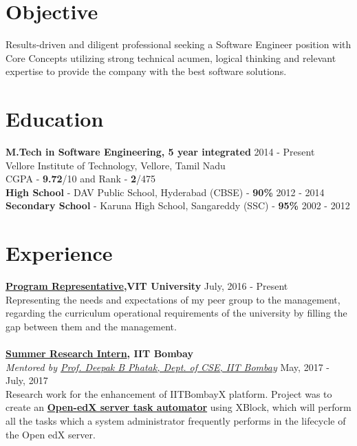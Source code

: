 \documentclass[margin, centered]{res}
\begin{document}
\begin{resume}

\section{Objective}
Results-driven and diligent professional seeking a Software Engineer position with Core Concepts utilizing strong technical acumen, logical thinking and relevant expertise to provide the company with the best software solutions.

\section{Education}
\textbf{M.Tech in Software Engineering, 5 year integrated} \hfill 2014 - Present \\
{Vellore Institute of Technology, Vellore, Tamil Nadu}\\
{CGPA - \textbf{9.72}/10 and Rank - \textbf{2}/475}\\
\textbf{High School} - {{DAV Public School, Hyderabad}} (CBSE) - \textbf{90\%} \hfill 2012 - 2014 \\
\textbf{Secondary School} - Karuna High School, Sangareddy (SSC) - \textbf{95\%} \hfill 2002 - 2012
 
\section{Experience}
\textbf{\href{https://drive.google.com/file/d/18-PW1eimQVanLYkNC0zvCAAHwokeDYhB/view?usp=sharing}{Program Representative},{VIT University}} \hfill July, 2016 - Present \\
Representing the needs and expectations of my peer group to the management, regarding the curriculum operational requirements of the university by filling the gap between them and the management. \\
\\
\textbf{\href{https://drive.google.com/file/d/0B9TCAG7AVugiVUh4c0VQSWtKUUE/view?usp=sharing}{Summer Research Intern}, {IIT Bombay}} \\
\emph{Mentored by \href{http://en.wikipedia.org/wiki/Deepak_B._Phatak}{Prof. Deepak B Phatak, Dept. of CSE, IIT Bombay}} \hfill May, 2017 - July, 2017 \\
Research work for the enhancement of IITBombayX platform. Project was to create an \textbf{\href{https://github.com/amolmishra23/edx-adminxblock}{Open-edX server task automator}} using XBlock, which will perform all the tasks which a system administrator frequently performs in the lifecycle of the Open edX server. 


\end{resume}
\end{document}
